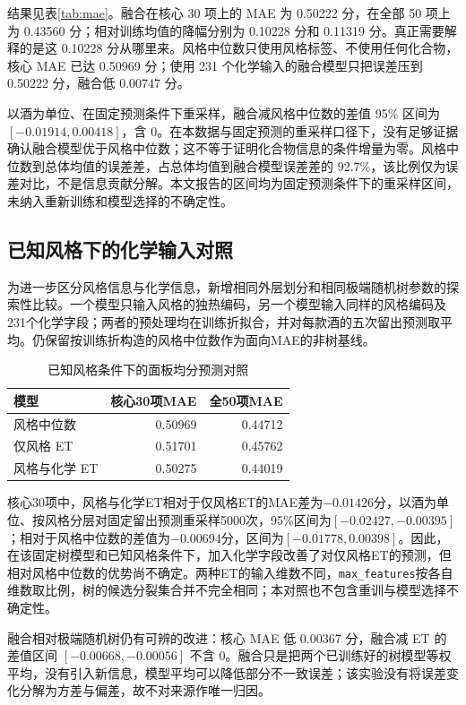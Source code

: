 结果见表\ref{tab:mae}。融合在核心 30 项上的 MAE 为 0.50222 分，在全部 50 项上为 0.43560 分；相对训练均值的降幅分别为 0.10228 分和 0.11319 分。真正需要解释的是这 0.10228 分从哪里来。风格中位数只使用风格标签、不使用任何化合物，核心 MAE 已达 0.50969 分；使用 231 个化学输入的融合模型只把误差压到 0.50222 分，融合低 0.00747 分。

以酒为单位、在固定预测条件下重采样，融合减风格中位数的差值 95\% 区间为 $[-0.01914,0.00418]$，含 0。在本数据与固定预测的重采样口径下，没有足够证据确认融合模型优于风格中位数；这不等于证明化合物信息的条件增量为零。风格中位数到总体均值的误差差，占总体均值到融合模型误差差的 92.7\%，该比例仅为误差对比，不是信息贡献分解。本文报告的区间均为固定预测条件下的重采样区间，未纳入重新训练和模型选择的不确定性。

\subsection{已知风格下的化学输入对照}

为进一步区分风格信息与化学信息，新增相同外层划分和相同极端随机树参数的探索性比较。一个模型只输入风格的独热编码，另一个模型输入同样的风格编码及231个化学字段；两者的预处理均在训练折拟合，并对每款酒的五次留出预测取平均。仍保留按训练折构造的风格中位数作为面向MAE的非树基线。

\begin{table}[t]
\centering\small
\caption{已知风格条件下的面板均分预测对照}\label{tab:styleincrement}
\begin{tabular}{@{}lrr@{}}
\toprule
模型 & 核心30项MAE & 全50项MAE\\
\midrule
风格中位数 & 0.50969 & 0.44712\\
仅风格 ET & 0.51701 & 0.45762\\
风格与化学 ET & 0.50275 & 0.44019\\
\bottomrule
\end{tabular}
\end{table}

核心30项中，风格与化学ET相对于仅风格ET的MAE差为$-0.01426$分，以酒为单位、按风格分层对固定留出预测重采样5000次，95\%区间为$[-0.02427,-0.00395]$；相对于风格中位数的差值为$-0.00694$分，区间为$[-0.01778,0.00398]$。因此，在该固定树模型和已知风格条件下，加入化学字段改善了对仅风格ET的预测，但相对风格中位数的优势尚不确定。两种ET的输入维数不同，\texttt{max\_features}按各自维数取比例，树的候选分裂集合并不完全相同；本对照也不包含重训与模型选择不确定性。

融合相对极端随机树仍有可辨的改进：核心 MAE 低 0.00367 分，融合减 ET 的差值区间 $[-0.00668,-0.00056]$ 不含 0。融合只是把两个已训练好的树模型等权平均，没有引入新信息，模型平均可以降低部分不一致误差；该实验没有将误差变化分解为方差与偏差，故不对来源作唯一归因。

